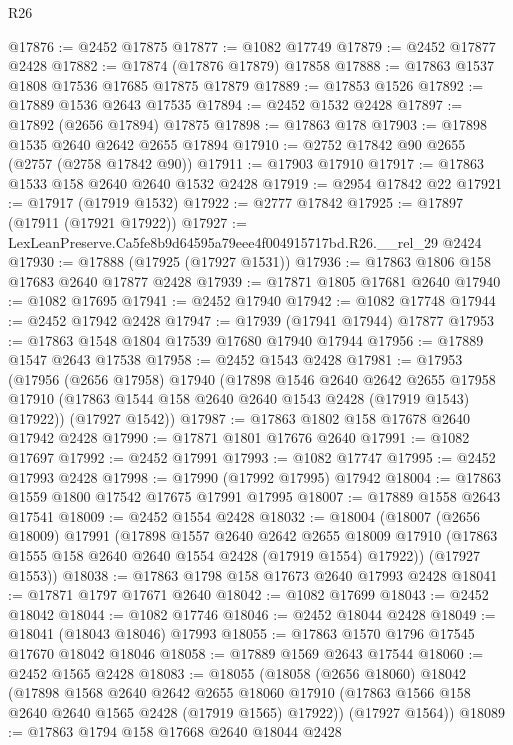 \begin{lexlean}{R26}
\begin{coremodule}
@17876 := @2452 @17875
@17877 := @1082 @17749
@17879 := @2452 @17877 @2428
@17882 := @17874 (@17876 @17879) @17858
@17888 := @17863 @1537 @1808 @17536 @17685 @17875 @17879
@17889 := @17853 @1526
@17892 := @17889 @1536 @2643 @17535
@17894 := @2452 @1532 @2428
@17897 := @17892 (@2656 @17894) @17875
@17898 := @17863 @178
@17903 := @17898 @1535 @2640 @2642 @2655 @17894
@17910 := @2752 @17842 @90 @2655 (@2757 (@2758 @17842 @90))
@17911 := @17903 @17910
@17917 := @17863 @1533 @158 @2640 @2640 @1532 @2428
@17919 := @2954 @17842 @22
@17921 := @17917 (@17919 @1532)
@17922 := @2777 @17842
@17925 := @17897 (@17911 (@17921 @17922))
@17927 := LexLeanPreserve.Ca5fe8b9d64595a79eee4f004915717bd.R26.__rel_29 @2424
@17930 := @17888 (@17925 (@17927 @1531))
@17936 := @17863 @1806 @158 @17683 @2640 @17877 @2428
@17939 := @17871 @1805 @17681 @2640
@17940 := @1082 @17695
@17941 := @2452 @17940
@17942 := @1082 @17748
@17944 := @2452 @17942 @2428
@17947 := @17939 (@17941 @17944) @17877
@17953 := @17863 @1548 @1804 @17539 @17680 @17940 @17944
@17956 := @17889 @1547 @2643 @17538
@17958 := @2452 @1543 @2428
@17981 := @17953
    (@17956
      (@2656 @17958)
      @17940
      (@17898
        @1546
        @2640
        @2642
        @2655
        @17958
        @17910
        (@17863 @1544 @158 @2640 @2640 @1543 @2428 (@17919 @1543) @17922))
      (@17927 @1542))
@17987 := @17863 @1802 @158 @17678 @2640 @17942 @2428
@17990 := @17871 @1801 @17676 @2640
@17991 := @1082 @17697
@17992 := @2452 @17991
@17993 := @1082 @17747
@17995 := @2452 @17993 @2428
@17998 := @17990 (@17992 @17995) @17942
@18004 := @17863 @1559 @1800 @17542 @17675 @17991 @17995
@18007 := @17889 @1558 @2643 @17541
@18009 := @2452 @1554 @2428
@18032 := @18004
    (@18007
      (@2656 @18009)
      @17991
      (@17898
        @1557
        @2640
        @2642
        @2655
        @18009
        @17910
        (@17863 @1555 @158 @2640 @2640 @1554 @2428 (@17919 @1554) @17922))
      (@17927 @1553))
@18038 := @17863 @1798 @158 @17673 @2640 @17993 @2428
@18041 := @17871 @1797 @17671 @2640
@18042 := @1082 @17699
@18043 := @2452 @18042
@18044 := @1082 @17746
@18046 := @2452 @18044 @2428
@18049 := @18041 (@18043 @18046) @17993
@18055 := @17863 @1570 @1796 @17545 @17670 @18042 @18046
@18058 := @17889 @1569 @2643 @17544
@18060 := @2452 @1565 @2428
@18083 := @18055
    (@18058
      (@2656 @18060)
      @18042
      (@17898
        @1568
        @2640
        @2642
        @2655
        @18060
        @17910
        (@17863 @1566 @158 @2640 @2640 @1565 @2428 (@17919 @1565) @17922))
      (@17927 @1564))
@18089 := @17863 @1794 @158 @17668 @2640 @18044 @2428

\end{coremodule}
\end{lexlean}
